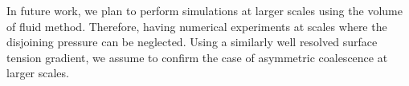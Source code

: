 \documentclass[twocolumn,amsmath,amssymb,showpacs,pre,nofootinbib,superscriptaddress]{revtex4-1} %
\begin{document}
In future work, we plan to perform simulations at larger scales using the volume of fluid method.
Therefore, having numerical experiments at scales where the disjoining pressure can be neglected.
Using a similarly well resolved surface tension gradient, we assume to confirm the case of asymmetric coalescence at larger scales.

\begin{acknowledgements}

\end{acknowledgements}


%



\end{document}
